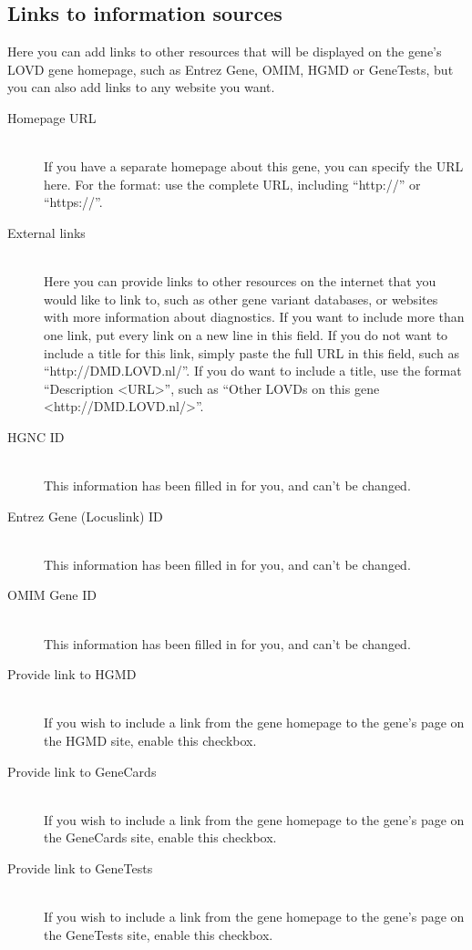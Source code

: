 \documentclass[a4paper,oneside,openany,12pt]{memoir}
\begin{document}
\subsection{Links to information sources}
Here you can add links to other resources that will be displayed on the gene's LOVD gene homepage, such as Entrez Gene, OMIM, HGMD or GeneTests, but you can also add links to any website you want.
\begin{description}
  \item[Homepage URL] \hfill \\
  If you have a separate homepage about this gene, you can specify the URL here.
  For the format: use the complete URL, including ``http://'' or ``https://''.
  \item[External links] \hfill \\
  Here you can provide links to other resources on the internet that you would like to link to, such as other gene variant databases, or websites with more information about diagnostics.
  If you want to include more than one link, put every link on a new line in this field.
  If you do not want to include a title for this link, simply paste the full URL in this field, such as ``http://DMD.LOVD.nl/''.
  If you do want to include a title, use the format ``Description <URL>'', such as ``Other LOVDs on this gene <http://DMD.LOVD.nl/>''.
  \item[HGNC ID] \hfill \\
  This information has been filled in for you, and can't be changed.
  \item[Entrez Gene (Locuslink) ID] \hfill \\
  This information has been filled in for you, and can't be changed.
  \item[OMIM Gene ID] \hfill \\
  This information has been filled in for you, and can't be changed.
  \item[Provide link to HGMD] \hfill \\
  If you wish to include a link from the gene homepage to the gene's page on the HGMD site, enable this checkbox.
  \item[Provide link to GeneCards] \hfill \\
  If you wish to include a link from the gene homepage to the gene's page on the GeneCards site, enable this checkbox.
  \item[Provide link to GeneTests] \hfill \\
  If you wish to include a link from the gene homepage to the gene's page on the GeneTests site, enable this checkbox.

\end{description}
\end{document}
